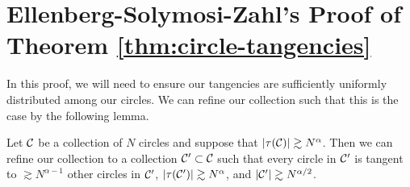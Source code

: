 \section[Ellenberg-Solymosi-Zahl's Proof]{Ellenberg-Solymosi-Zahl's Proof of Theorem \ref{thm:circle-tangencies}}
In this proof, we will need to ensure our tangencies
are sufficiently uniformly distributed among our circles. We can refine our collection such that this is the case by the following lemma.

\begin{lemma}
    Let $\mathcal C$ be a collection of $N$ circles and suppose that $|\tau(\mathcal C)| \gtrsim N^{\alpha}$. 
    Then we can refine our collection to a collection $\mathcal C' \subset \mathcal C$ such that every circle in $\mathcal C'$ is tangent to $\gtrsim N^{\alpha -1}$ other circles in $\mathcal C'$, $|\tau(\mathcal C')| \gtrsim N^{\alpha}$, and $|\mathcal C'| \gtrsim N^{\alpha/2}$. \label{lem:uniform-refine}
\end{lemma}

